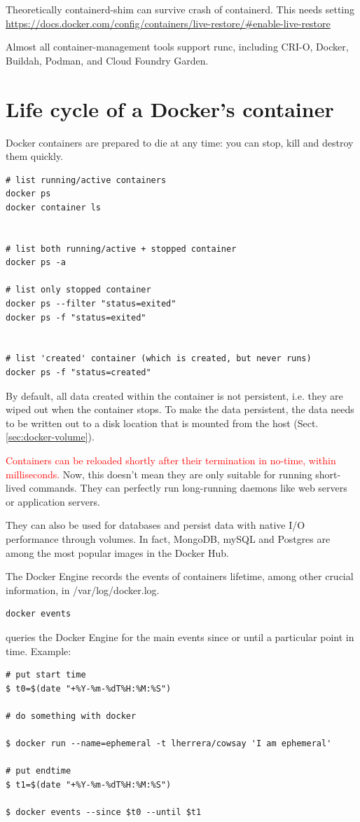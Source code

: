 Theoretically containerd-shim can survive crash of containerd.
This needs setting
\url{https://docs.docker.com/config/containers/live-restore/#enable-live-restore}

Almost all container-management tools support runc, including CRI-O, Docker,
Buildah, Podman, and Cloud Foundry Garden.

\section{Life cycle of a Docker's container}
\label{sec:container-lifecycle}

Docker containers are prepared to die at any time: you can stop, kill and
destroy them quickly.

\begin{verbatim}
# list running/active containers
docker ps
docker container ls


# list both running/active + stopped container
docker ps -a

# list only stopped container
docker ps --filter "status=exited"
docker ps -f "status=exited"


# list 'created' container (which is created, but never runs)
docker ps -f "status=created"

\end{verbatim}

By default, all data created within the container is not persistent, i.e. they
are wiped out when the container stops.
To make the data persistent, the data needs to be written out to a disk location
that is mounted from the host (Sect.\ref{sec:docker-volume}).

\textcolor{red}{Containers can be reloaded shortly after their termination in no-time, within milliseconds.}
Now, this doesn’t mean they are only suitable for running short-lived commands.
They can perfectly run long-running daemons like web servers or application
servers.

They can also be used for databases and persist data with native I/O performance
through volumes. In fact, MongoDB, mySQL and Postgres are among the most popular
images in the Docker Hub.

The Docker Engine records the events of containers lifetime, among other crucial
information, in /var/log/docker.log.


\begin{verbatim}
docker events
\end{verbatim}
queries the Docker Engine for the main events since or until a particular point in time.
Example:
\begin{verbatim}
# put start time
$ t0=$(date "+%Y-%m-%dT%H:%M:%S")

# do something with docker

$ docker run --name=ephemeral -t lherrera/cowsay 'I am ephemeral'

# put endtime
$ t1=$(date "+%Y-%m-%dT%H:%M:%S") 

$ docker events --since $t0 --until $t1
\end{verbatim}


